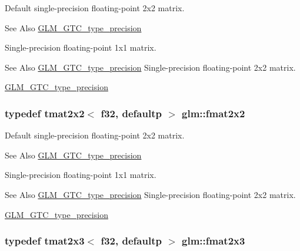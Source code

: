 Default single-\/precision floating-\/point 2x2 matrix. \begin{DoxySeeAlso}{See Also}
\hyperlink{group__gtc__type__precision}{G\-L\-M\-\_\-\-G\-T\-C\-\_\-type\-\_\-precision}
\end{DoxySeeAlso}
Single-\/precision floating-\/point 1x1 matrix. \begin{DoxySeeAlso}{See Also}
\hyperlink{group__gtc__type__precision}{G\-L\-M\-\_\-\-G\-T\-C\-\_\-type\-\_\-precision} Single-\/precision floating-\/point 2x2 matrix. 

\hyperlink{group__gtc__type__precision}{G\-L\-M\-\_\-\-G\-T\-C\-\_\-type\-\_\-precision} 
\end{DoxySeeAlso}
\hypertarget{group__gtc__type__precision_ga20fdbcc6b16bed27ad25db9b71d09e93}{
\subsubsection[{fmat2x2}]{\setlength{\rightskip}{0pt plus 5cm}typedef tmat2x2$<$ f32, defaultp $>$ {\bf glm\-::fmat2x2}}}\label{group__gtc__type__precision_ga20fdbcc6b16bed27ad25db9b71d09e93}
Default single-\/precision floating-\/point 2x2 matrix. \begin{DoxySeeAlso}{See Also}
\hyperlink{group__gtc__type__precision}{G\-L\-M\-\_\-\-G\-T\-C\-\_\-type\-\_\-precision}
\end{DoxySeeAlso}
Single-\/precision floating-\/point 1x1 matrix. \begin{DoxySeeAlso}{See Also}
\hyperlink{group__gtc__type__precision}{G\-L\-M\-\_\-\-G\-T\-C\-\_\-type\-\_\-precision} Single-\/precision floating-\/point 2x2 matrix. 

\hyperlink{group__gtc__type__precision}{G\-L\-M\-\_\-\-G\-T\-C\-\_\-type\-\_\-precision} 
\end{DoxySeeAlso}
\hypertarget{group__gtc__type__precision_ga80f463bcb7e5008c11af5fdbc52c0045}{
\subsubsection[{fmat2x3}]{\setlength{\rightskip}{0pt plus 5cm}typedef tmat2x3$<$ f32, defaultp $>$ {\bf glm\-::fmat2x3}}}\label{group__gtc__type__precision_ga80f463bcb7e5008c11af5fdbc52c0045}

